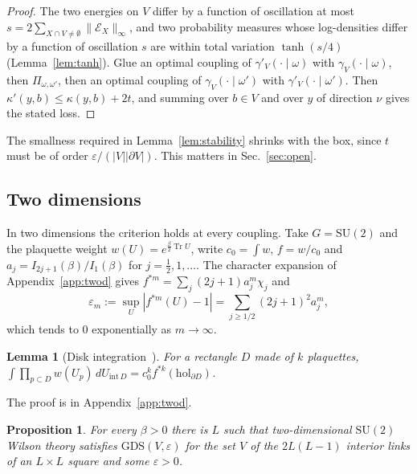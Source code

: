 \documentclass[aps,prd,twocolumn,superscriptaddress,nofootinbib,longbibliography,floatfix,amsmath,amssymb,10pt]{revtex4-2}
\newtheorem{lemma}[theorem]{Lemma}
\newtheorem{proposition}[theorem]{Proposition}
\theoremstyle{definition}
\theoremstyle{remark}
\newcommand{\SU}{\mathrm{SU}}
\newcommand{\Tr}{\operatorname{Tr}}
\begin{document}
\begin{proof}
The two energies on $V$ differ by a function of oscillation at most
$s=2\sum_{X\cap V\ne\emptyset}\|\mathcal E_X\|_\infty$, and two probability
measures whose log-densities differ by a function of oscillation $s$ are
within total variation $\tanh(s/4)$ (Lemma~\ref{lem:tanh}). Glue an optimal
coupling of $\gamma'_V(\cdot\mid\omega)$ with $\gamma_V(\cdot\mid\omega)$,
then $\Pi_{\omega,\omega'}$, then an optimal coupling of
$\gamma_V(\cdot\mid\omega')$ with $\gamma'_V(\cdot\mid\omega')$. Then
$\kappa'(y,b)\le\kappa(y,b)+2t$, and summing over $b\in V$ and over $y$ of
direction $\nu$ gives the stated loss.
\end{proof}

The smallness required in Lemma~\ref{lem:stability} shrinks with the box,
since $t$ must be of order $\varepsilon/(|V||\partial V|)$. This matters in
Sec.~\ref{sec:open}.

\subsection{Two dimensions}

In two dimensions the criterion holds at every coupling. Take $G=\SU(2)$ and
the plaquette weight $w(U)=e^{\frac\beta2\Tr U}$, write $c_0=\int w$,
$f=w/c_0$ and $a_j=I_{2j+1}(\beta)/I_1(\beta)$ for $j=\frac12,1,\dots$. The
character expansion of Appendix~\ref{app:twod} gives
$f^{*m}=\sum_j(2j+1)a_j^m\chi_j$ and
\[
\varepsilon_m:=\sup_U|f^{*m}(U)-1|=\sum_{j\ge1/2}(2j+1)^2a_j^m,
\]
which tends to $0$ exponentially as $m\to\infty$.

\begin{lemma}[Disk integration~\cite{Mig75,Lev03}]\label{lem:disk}
For a rectangle $D$ made of $k$ plaquettes,
$\int\prod_{p\subset D}w(U_p)\,dU_{\mathrm{int}\,D}=c_0^kf^{*k}(\mathrm{hol}_{
\partial D})$.
\end{lemma}

The proof is in Appendix~\ref{app:twod}.

\begin{proposition}\label{prop:2d}
For every $\beta>0$ there is $L$ such that two-dimensional $\SU(2)$ Wilson
theory satisfies $\mathrm{GDS}(V,\varepsilon)$ for the set $V$ of the
$2L(L-1)$ interior links of an $L\times L$ square and some $\varepsilon>0$.
\end{proposition}
\end{document}
